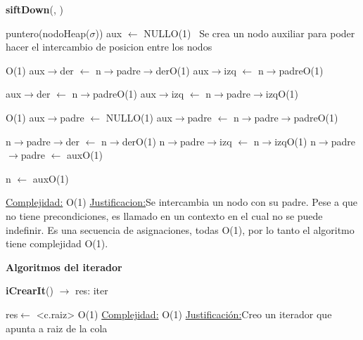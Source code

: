 \begin{Representacion}
\begin{Algoritmos}
\begin{algorithm}[H]{\textbf{siftDown}(, )}
	\begin{algorithmic}[1]
		
		\State puntero(nodoHeap($\sigma$)) aux $\leftarrow$ NULL\Comment O(1) $\,$
		\Comment Se crea un nodo auxiliar para poder hacer el intercambio de posicion entre los nodos
		
		\Comment O(1)
			\State aux$\rightarrow$der $\leftarrow$ n$\rightarrow$padre$\rightarrow$der\Comment O(1)
			\State aux$\rightarrow$izq $\leftarrow$ n$\rightarrow$padre\Comment O(1)
			
		\Else
			\State aux$\rightarrow$der $\leftarrow$ n$\rightarrow$padre\Comment O(1)
			\State aux$\rightarrow$izq $\leftarrow$ n$\rightarrow$padre$\rightarrow$izq\Comment O(1)
		\EndIf
				
			
			
		\Comment O(1)
			\State aux$\rightarrow$padre $\leftarrow$ NULL\Comment O(1)
		\Else
			\State aux$\rightarrow$padre $\leftarrow$ n$\rightarrow$padre$\rightarrow$padre\Comment O(1)
		\EndIf
		
		\State n$\rightarrow$padre$\rightarrow$der $\leftarrow$ n$\rightarrow$der\Comment O(1)
		\State n$\rightarrow$padre$\rightarrow$izq $\leftarrow$ n$\rightarrow$izq\Comment O(1)
		\State n$\rightarrow$padre$\rightarrow$padre $\leftarrow$ aux\Comment O(1)
		
		\State n $\leftarrow$ aux\Comment O(1)
		
		\medskip
		\Statex \underline{Complejidad:} O(1)
			\Statex \underline{Justificacion:}Se intercambia un nodo con su padre. Pese a que no tiene precondiciones, es llamado en un contexto en el cual no se puede indefinir. Es una secuencia de asignaciones, todas O(1), por lo tanto el algoritmo tiene complejidad O(1). 
	\end{algorithmic}
\end{algorithm}

\bf{Algoritmos del iterador}

\begin{algorithm}[H]{\textbf{iCrearIt}() $\to$ res: iter}
	\begin{algorithmic}[1]
		\State res$\gets$ <c.raiz> \Comment O(1)
		\medskip
		\Statex \underline{Complejidad:} O(1)
			\Statex \underline{Justificación:}Creo un iterador que apunta a raiz de la cola
	\end{algorithmic}
\end{algorithm}


\end{Algoritmos}
\end{Representacion}
